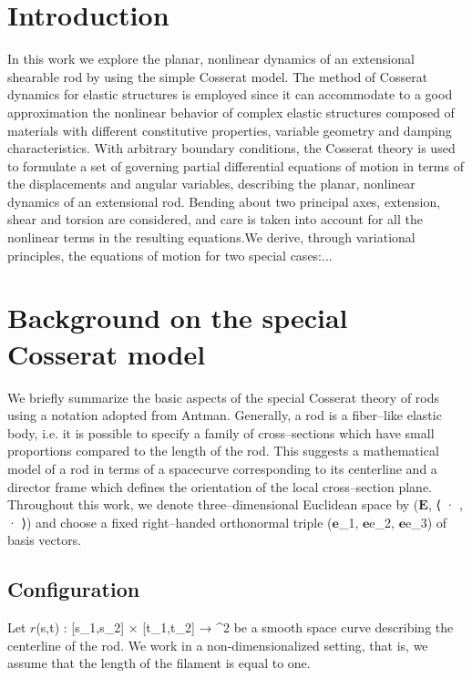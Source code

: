 \documentclass[12pt]{article}
\begin{document}
\section{Introduction}
In this work we explore the planar, nonlinear dynamics of an extensional shearable rod by using the simple Cosserat model. The method of Cosserat dynamics for elastic structures is employed since it can accommodate to a good approximation the nonlinear behavior of complex elastic structures composed of materials with different constitutive properties, variable geometry and damping characteristics. With arbitrary boundary conditions, the Cosserat theory is used to formulate a set of governing partial differential equations of motion in terms of the displacements and angular variables, describing the planar, nonlinear dynamics of an extensional rod. Bending about two principal axes, extension, shear and torsion are considered, and care is taken into account for all the nonlinear terms in the resulting equations.We derive, through variational principles, the equations of motion for two special cases:...

\section{Background on the special Cosserat model}
We briefly summarize the basic aspects of the special Cosserat theory of rods using a notation adopted from Antman. Generally, a rod is a fiber–like elastic body, i.e. it is possible to specify a family of cross–sections which have small proportions compared to the length of the rod. This suggests a mathematical model of a rod in terms of a spacecurve corresponding to its centerline and a director frame which defines the orientation of the local
cross–section plane.
Throughout this work, we denote three–dimensional Euclidean space by ($\mathbf{E}$, ⟨ · , · ⟩) and choose a fixed right–handed orthonormal triple ($\mathbf{e}$_1, $\mathbf{e}${e}_2, $\mathbf{e}${e}_3) of basis vectors.
\subsection{Configuration}
Let $r$(s,t) : [s_1,s_2] × [t_1,t_2] → ^2 be a smooth space curve describing the centerline of the rod.
We work in a non-dimensionalized setting, that is, we assume that the length of the filament is equal to one.
\end{document}
